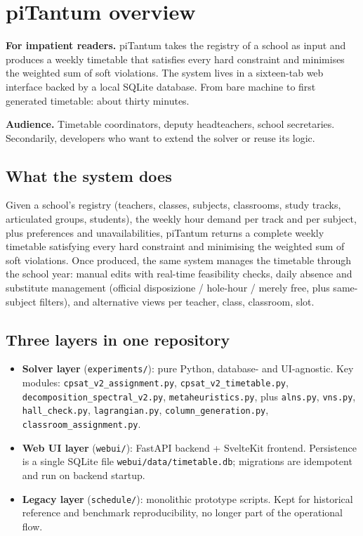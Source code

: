 \chapter{piTantum overview}
\label{ch:panoramica_pitantum_en}


\textbf{For impatient readers.} piTantum takes the registry of a
school as input and produces a weekly timetable that satisfies
every hard constraint and minimises the weighted sum of soft
violations. The system lives in a sixteen-tab web interface
backed by a local SQLite database. From bare machine to first
generated timetable: about thirty minutes.

\textbf{Audience.} Timetable coordinators, deputy headteachers,
school secretaries. Secondarily, developers who want to extend
the solver or reuse its logic.

\section*{What the system does}

Given a school's registry (teachers, classes, subjects,
classrooms, study tracks, articulated groups, students), the
weekly hour demand per track and per subject, plus preferences
and unavailabilities, piTantum returns a complete weekly
timetable satisfying every hard constraint and minimising the
weighted sum of soft violations. Once produced, the same system
manages the timetable through the school year: manual edits with
real-time feasibility checks, daily absence and substitute
management (official disposizione / hole-hour / merely free,
plus same-subject filters), and alternative views per teacher,
class, classroom, slot.

\section*{Three layers in one repository}

\begin{itemize}
\item \textbf{Solver layer} (\texttt{experiments/}): pure Python,
  database- and UI-agnostic. Key modules:
  \texttt{cpsat\_v2\_assignment.py},
  \texttt{cpsat\_v2\_timetable.py},
  \texttt{decomposition\_spectral\_v2.py},
  \texttt{metaheuristics.py}, plus \texttt{alns.py},
  \texttt{vns.py}, \texttt{hall\_check.py},
  \texttt{lagrangian.py}, \texttt{column\_generation.py},
  \texttt{classroom\_assignment.py}.
\item \textbf{Web UI layer} (\texttt{webui/}): FastAPI backend +
  SvelteKit frontend. Persistence is a single SQLite file
  \texttt{webui/data/timetable.db}; migrations are idempotent
  and run on backend startup.
\item \textbf{Legacy layer} (\texttt{schedule/}): monolithic
  prototype scripts. Kept for historical reference and benchmark
  reproducibility, no longer part of the operational flow.
\end{itemize}

